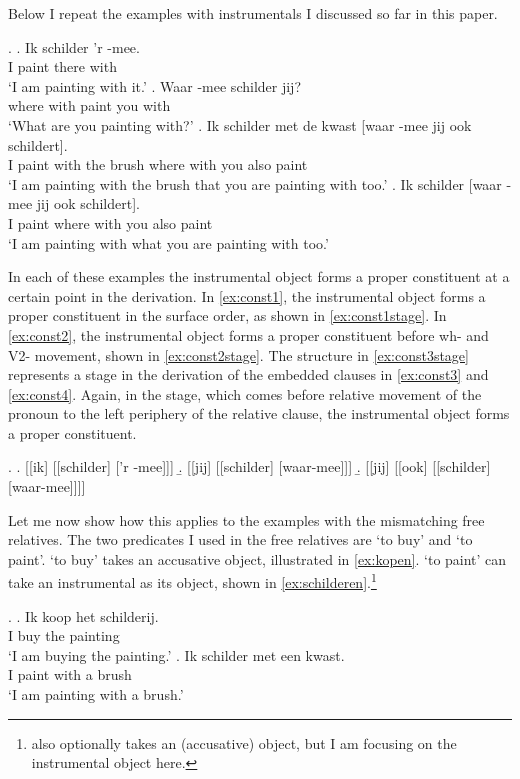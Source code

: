 \documentclass[12pt]{article}
\begin{document}
Below I repeat the examples with instrumentals I discussed so far in this paper.

\ex.
\ag. Ik schilder 'r -mee.\\
 I paint there with\\
 `I am painting with it.'\label{ex:const1}
\bg. Waar -mee schilder jij?\\
where with paint you with\\
 `What are you painting with?'\label{ex:const2}
\bg. Ik schilder met de kwast [waar -mee jij ook schildert].\\
 I paint with the brush where with you also paint\\
 `I am painting with the brush that you are painting with too.'\label{ex:const3}
\bg. Ik schilder [waar -mee jij ook schildert].\\
 I paint where with you also paint\\
 `I am painting with what you are painting with too.'\label{ex:const4}

In each of these examples the instrumental object forms a proper constituent at a certain point in the derivation. In \ref{ex:const1}, the instrumental object forms a proper constituent in the surface order, as shown in \ref{ex:const1stage}. In \ref{ex:const2}, the instrumental object forms a proper constituent before wh- and V2- movement, shown in \ref{ex:const2stage}.
The structure in \ref{ex:const3stage} represents a stage in the derivation of the embedded clauses in \ref{ex:const3} and \ref{ex:const4}. Again, in the stage, which comes before relative movement of the pronoun to the left periphery of the relative clause, the instrumental object forms a proper constituent.

\ex.
\a. [[ik] [[schilder] ['r -mee]]]\label{ex:const1stage}
\b. [[jij] [[schilder] [waar-mee]]]\label{ex:const2stage}
\b. [[jij] [[ook] [[schilder] [waar-mee]]]]\label{ex:const3stage}

Let me now show how this applies to the examples with the mismatching free relatives. The two predicates I used in the free relatives are  `to buy' and   `to paint'.  `to buy' takes an accusative object, illustrated in \ref{ex:kopen}.  `to paint' can take an instrumental as its object, shown in \ref{ex:schilderen}.\footnote{ also optionally takes an (accusative) object, but I am focusing on the instrumental object here.}

\ex.
\ag. Ik koop het schilderij.\\
 I buy the painting\\
 `I am buying the painting.'\label{ex:kopen}
\bg. Ik schilder met een kwast.\\
 I paint with a brush\\
 `I am painting with a brush.'\label{ex:schilderen}
\end{document}
